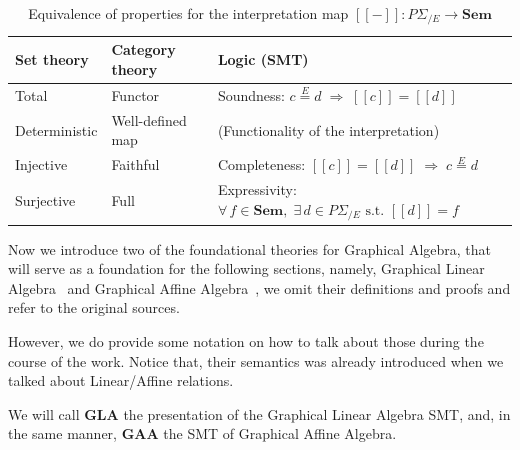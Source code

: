 \begin{table}[h!]
	\centering
	\caption{Equivalence of properties for the interpretation map
	$[\![{-}]\!] : P\Sigma_{/E} \to \mathbf{Sem}$}
	\label{tab:equivalences}
	\begin{tabular}{
			m{3.2cm}
			m{3.2cm}
			m{4.5cm}
		}
        \\
		\toprule
		\textbf{Set theory}      &
		\textbf{Category theory} &
		\textbf{Logic (SMT)}                                                                                     \\
		\midrule

		Total                    &
		Functor                  &
		Soundness: $c \overset{E}{=} d \;\Rightarrow\; [\![c]\!] = [\![d]\!]$                                    \\[6pt]

		Deterministic            &
		Well-defined map         &
		(Functionality of the interpretation)                                                                    \\[6pt]

		Injective                &
		Faithful                 &
		Completeness: $[\![c]\!] = [\![d]\!] \;\Rightarrow\; c \overset{E}{=} d$                                 \\[6pt]

		Surjective               &
		Full                     &
		Expressivity: $\forall\, f \in \mathbf{Sem},\; \exists\, d \in P\Sigma_{/E} \text{ s.t. } [\![d]\!] = f$ \\

		\bottomrule
	\end{tabular}
\end{table}

Now we introduce two of the foundational theories for Graphical Algebra, that will serve as a foundation for the following sections, namely, Graphical Linear Algebra~\cite{paixao2022highlevel, bonchi2017interacting} and Graphical Affine Algebra~\cite{bonchi2019affine}, we omit their definitions and proofs and refer to the original sources.

However, we do provide some notation on how to talk about those during the course of the work. Notice that, their semantics was already introduced when we talked about Linear/Affine relations.

\begin{definition}
	We will call $\textbf{GLA}$ the presentation of the Graphical Linear Algebra SMT, and, in the same manner, $\textbf{GAA}$ the SMT of Graphical Affine Algebra.
\end{definition}

